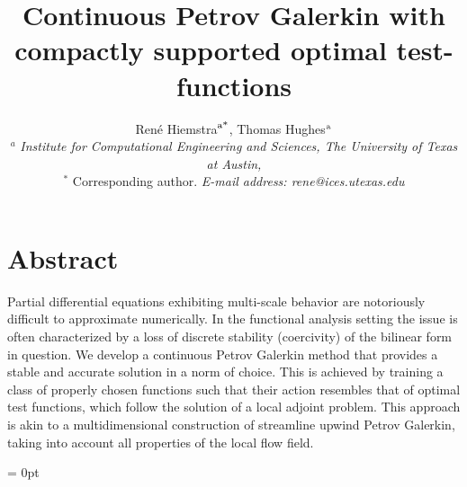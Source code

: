 \documentclass[12pt]{article}
\begin{document}
\title{Continuous Petrov Galerkin with compactly supported optimal test-functions}

\author{Ren\'{e} Hiemstra$^{\textup{a*}}$, Thomas Hughes$^{\textup{a}}$ \\
$^a$ \textit{\small Institute for Computational Engineering and Sciences, The University of Texas at Austin,} \\
$^*$ \small Corresponding author.  \textit{E-mail address: rene@ices.utexas.edu}}

\date{}
\maketitle

\section*{Abstract} Partial differential equations exhibiting multi-scale behavior are notoriously difficult to approximate numerically. In the functional analysis setting the issue is often characterized by a loss of discrete stability (coercivity) of the bilinear form in question. We develop a continuous Petrov Galerkin method that provides a stable and accurate solution in a norm of choice. This is achieved by training a class of properly chosen functions such that their action resembles that of optimal test functions, which follow the solution of a local adjoint problem. This approach is akin to a multidimensional construction of streamline upwind Petrov Galerkin, taking into account all properties of the local flow field.
\\


\newpage

\thispagestyle{plain}
\headheight = 0pt

\label{sec:intro}
%




\end{document}
